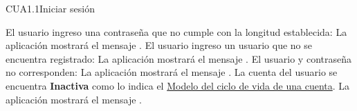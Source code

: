 \begin{UseCase}{CUA1.1}{Iniciar sesión}
{\begin{UClist}
		\UCli El usuario ingreso una contraseña que no cumple con la longitud establecida: La aplicación mostrará el mensaje .
		\UCli El usuario ingreso un usuario que no se encuentra registrado:  La aplicación mostrará el mensaje .
		\UCli El usuario y contraseña no corresponden: La aplicación mostrará el mensaje .
		\UCli La cuenta del usuario se encuentra \textbf{Inactiva} como lo indica el \hyperlink{cv:Cuenta}{Modelo del ciclo de vida de una cuenta}. La aplicación mostrará el mensaje .
	\end{UClist}
    }


\end{UseCase}


